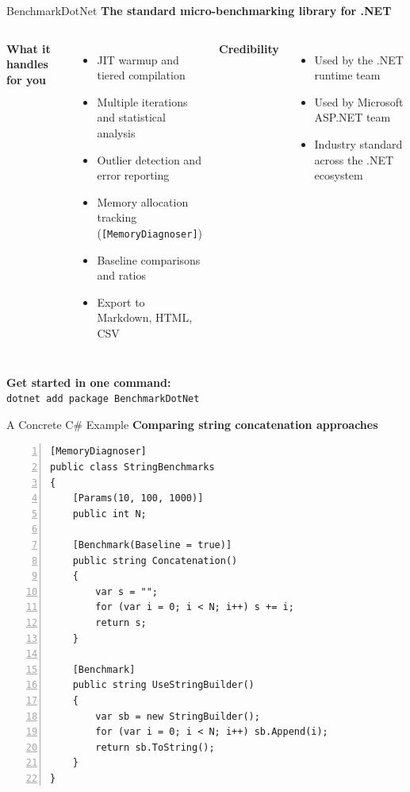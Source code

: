 \documentclass[aspectratio=1610, xcolor=table]{beamer}
\begin{document}
\begin{frame}{BenchmarkDotNet}
	\textbf{The standard micro-benchmarking library for .NET}

	\vspace{0.8em}
	\begin{columns}[T]
		\textbf{What it handles for you}
		\begin{itemize}
			\item JIT warmup and tiered compilation
			\item Multiple iterations and statistical analysis
			\item Outlier detection and error reporting
			\item Memory allocation tracking (\texttt{[MemoryDiagnoser]})
			\item Baseline comparisons and ratios
			\item Export to Markdown, HTML, CSV
		\end{itemize}

		\textbf{Credibility}
		\begin{itemize}
			\item Used by the .NET runtime team
			\item Used by Microsoft ASP.NET team
			\item Industry standard across the .NET ecosystem
		\end{itemize}
	\end{columns}

	\vspace{1em}
	\textbf{Get started in one command:}\\
	\vspace{0.3em}
	\texttt{\textcolor{SecondaryAccent}{dotnet add package BenchmarkDotNet}}
\end{frame}

\begin{frame}[fragile]{A Concrete C\# Example}
	\textbf{Comparing string concatenation approaches}

	\begin{lstlisting}[language={[Sharp]C}, basicstyle=\ttfamily\tiny\color{CodeText}, numbers=left]
[MemoryDiagnoser]
public class StringBenchmarks
{
    [Params(10, 100, 1000)]
    public int N;

    [Benchmark(Baseline = true)]
    public string Concatenation()
    {
        var s = "";
        for (var i = 0; i < N; i++) s += i;
        return s;
    }

    [Benchmark]
    public string UseStringBuilder()
    {
        var sb = new StringBuilder();
        for (var i = 0; i < N; i++) sb.Append(i);
        return sb.ToString();
    }
}
	\end{lstlisting}
\end{frame}
\end{document}
